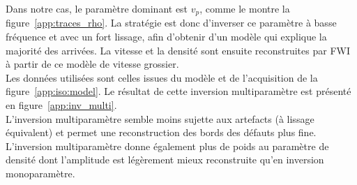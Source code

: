  Dans notre cas, le paramètre dominant est $v_{p}$, comme le montre la figure~\ref{app:traces_rho}. La stratégie est donc d'inverser ce paramètre à basse fréquence et avec un fort lissage, afin d'obtenir d'un modèle qui explique la majorité des arrivées. La vitesse et la densité sont ensuite reconstruites par FWI à partir de ce modèle de vitesse grossier. \\
 
Les données utilisées sont celles issues du modèle et de l'acquisition de la figure~\ref{app:iso:model}.  Le résultat de cette inversion multiparamètre est présenté en figure~\ref{app:inv_multi}. 
\\

L'inversion multiparamètre semble moins sujette aux artefacts (à lissage équivalent)  et permet une reconstruction des bords des défauts plus fine. L'inversion multiparamètre donne également plus de poids au paramètre de densité dont l'amplitude est légèrement mieux reconstruite qu'en inversion monoparamètre.  




